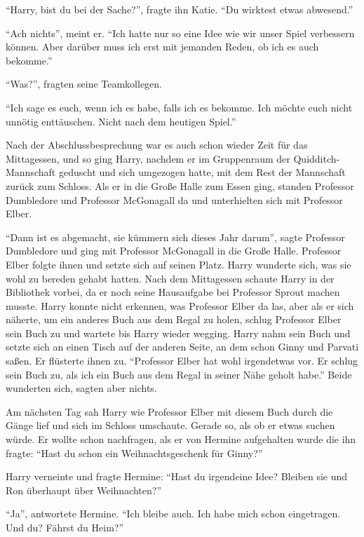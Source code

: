 \enquote{Harry, bist du bei der Sache?}, fragte ihn Katie. \enquote{Du wirktest etwas abwesend.}

\enquote{Ach nichts}, meint er. \enquote{Ich hatte nur so eine Idee wie wir unser Spiel verbessern können. Aber darüber muss ich erst mit jemanden Reden, ob ich es auch bekomme.}

\enquote{Was?}, fragten seine Teamkollegen.

\enquote{Ich sage es euch, wenn ich es habe, falls ich es bekomme. Ich möchte euch nicht unnötig enttäuschen. Nicht nach dem heutigen Spiel.}

Nach der Abschlussbesprechung war es auch schon wieder Zeit für das Mittagessen, und so ging Harry, nachdem er im Gruppenraum der Quidditch-Mannschaft geduscht und sich umgezogen hatte, mit dem Rest der Mannschaft zurück zum Schloss. Als er in die Große Halle zum Essen ging, standen Professor Dumbledore und Professor McGonagall da und unterhielten sich mit Professor Elber.

\enquote{Dann ist es abgemacht, sie kümmern sich dieses Jahr darum}, sagte Professor Dumbledore und ging mit Professor McGonagall in die Große Halle. Professor Elber folgte ihnen und setzte sich auf seinen Platz. Harry wunderte sich, was sie wohl zu bereden gehabt hatten. Nach dem Mittagessen schaute Harry in der Bibliothek vorbei, da er noch seine Hausaufgabe bei Professor Sprout machen musste. Harry konnte nicht erkennen, was Professor Elber da las, aber als er sich näherte, um ein anderes Buch aus dem Regal zu holen, schlug Professor Elber sein Buch zu und wartete bis Harry wieder wegging. Harry nahm sein Buch und setzte sich an einen Tisch auf der anderen Seite, an dem schon Ginny und Parvati saßen. Er flüsterte ihnen zu. \enquote{Professor Elber hat wohl irgendetwas vor. Er schlug sein Buch zu, als ich ein Buch aus dem Regal in seiner Nähe geholt habe.} Beide wunderten sich, sagten aber nichts.

Am nächsten Tag sah Harry wie Professor Elber mit diesem Buch durch die Gänge lief und sich im Schloss umschaute. Gerade so, als ob er etwas suchen würde. Er wollte schon nachfragen, als er von Hermine aufgehalten wurde die ihn fragte: \enquote{Hast du schon ein Weihnachtsgeschenk für Ginny?}

Harry verneinte und fragte Hermine: \enquote{Hast du irgendeine Idee? Bleiben sie und Ron überhaupt über Weihnachten?}

\enquote{Ja}, antwortete Hermine. \enquote{Ich bleibe auch. Ich habe mich schon eingetragen. Und du? Fährst du Heim?}

